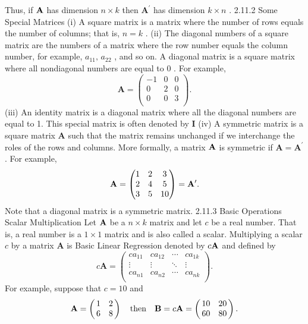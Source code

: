 \documentclass[11pt]{article}
\begin{document}
Thus, if \({\bf A}\) has dimension \(n \times k\) then \(\mathbf{A^{\prime}}\) has dimension \(k \times n\) .
2.11.2 Some Special Matrices
(i) A square matrix is a matrix where the number of rows equals the number
of columns; that is, \(n=k\) .
(ii) The diagonal numbers of a square matrix are the numbers of a matrix
 where the row number equals the column number, for example, \(a_{1 1} , \, a_{2 2}\) ,
 and so on. A diagonal matrix is a square matrix where all nondiagonal
numbers are equal to \(0\) . For example,
\[
\mathbf{A}=\left( \begin{matrix} {-1} & {0} & {0} \\ {0} & {2} & {0} \\ {0} & {0} & {3} \\ \end{matrix} \right) .
\]
(iii) An identity matrix is a diagonal matrix where all the diagonal numbers
 are equal to 1. This special matrix is often denoted by \(\mathbf{I}\)
(iv) A symmetric matrix is a square matrix \(\mathbf{A}\) such that the matrix remains
unchanged if we interchange the roles of the rows and columns. More
formally, a matrix \({\bf A}\) is symmetric if \(\mathbf{A}=\mathbf{A^{\prime}}\) . For example,
\[
{\bf A}=\left( \begin{matrix} {1} & {2} & {3} \\ {2} & {4} & {5} \\ {3} & {5} & {1 0} \\ \end{matrix} \right)={\bf A}^{\prime} .
\]
Note that a diagonal matrix is a symmetric matrix.
 2.11.3 Basic Operations
 Scalar Multiplication
Let \({\bf A}\) be a \(n \times k\) matrix and let \(c\) be a real number. That is, a real number is a
\(1 \times1\) matrix and is also called a scalar. Multiplying a scalar \(c\) by a matrix \(\mathbf{A}\) is
 Basic Linear Regression
denoted by \(c {\bf A}\) and defined by
\[
c \mathbf{A}=\left( \begin{matrix} {c a_{1 1}} & {c a_{1 2}} & {\cdots} & {c a_{1 k}} \\ {\vdots} & {\vdots} & {\ddots} & {\vdots} \\ {c a_{n 1}} & {c a_{n 2}} & {\cdots} & {c a_{n k}} \\ \end{matrix} \right) .
\]
For example, suppose that \(c=1 0\) and
\[
\mathbf{A}=\left( \! \! \begin{array} {c c} {1} & {2} \\ {6} & {8} \\ \end{array} \! \! \right) \quad\mathrm{t h e n} \quad\mathbf{B}=c \mathbf{A}=\left( \! \! \begin{array} {c c} {1 0} & {2 0} \\ {6 0} & {8 0} \\ \end{array} \! \! \right) .
\]
\end{document}
